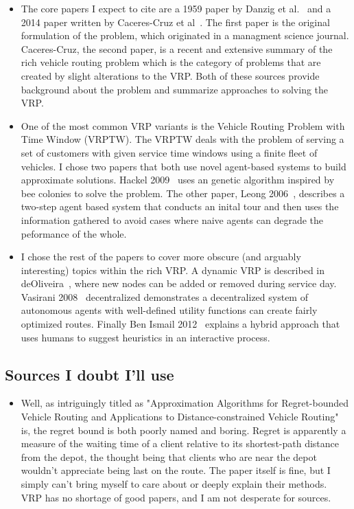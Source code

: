 \documentclass{sig-alternate}
\begin{document}
\begin{itemize}
	\item The core papers I expect to cite are a 1959 paper by Danzig et al.~\cite{Danzig:1959} and a 2014 paper written by Caceres-Cruz et al~\cite{Caceres-Cruz:2014}. The first paper is the original formulation of the problem, which originated in a managment science journal. Caceres-Cruz, the second paper, is a recent and extensive summary of the rich vehicle routing problem which is the category of problems that are created by slight alterations to the VRP. Both of these sources provide background about the problem and summarize approaches to solving the VRP. 
	\item One of the most common VRP variants is the Vehicle Routing Problem with Time Window (VRPTW). The VRPTW deals with the problem of serving a set of customers with given service time windows using a finite fleet of vehicles. I chose two papers that both use novel agent-based systems to build approximate solutions. Hackel 2009~\cite{Hackel:2009} uses an genetic algorithm inspired by bee colonies to solve the problem. The other paper, Leong 2006~\cite{Leong:2006}, describes a two-step agent based system that conducts an inital tour and then uses the information gathered to avoid cases where naive agents can degrade the peformance of the whole.
	\item I chose the rest of the papers to cover more obscure (and arguably interesting) topics within the rich VRP. A dynamic VRP is described in deOliveira~\cite{deOliveira:2008}, where new nodes can be added or removed during service day. Vasirani 2008~\cite{Vasirani:2008} decentralized demonstrates a decentralized system of autonomous agents with well-defined utility functions can create fairly optimized routes. Finally Ben Ismail 2012~\cite{BenIsmail:2012} explains a hybrid approach that uses humans to suggest heuristics in an interactive process.
\end{itemize}

\subsection{Sources I doubt I'll use}

\begin{itemize}
	\item Well, as intriguingly titled as "Approximation Algorithms for Regret-bounded Vehicle Routing and Applications to Distance-constrained Vehicle Routing"~\cite{Friggstad:2014} is, the regret bound is both poorly named and boring. Regret is apparently a measure of the waiting time of a client relative to its shortest-path distance from the depot, the thought being that clients who are near the depot wouldn't appreciate being last on the route. The paper itself is fine, but I simply can't bring myself to care about or deeply explain their methods. VRP has no shortage of good papers, and I am not desperate for sources.
\end{itemize}
\end{document}
